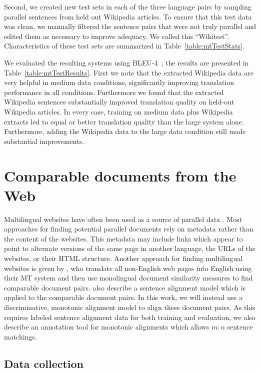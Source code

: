 Second, we created new test sets in each of the three language
pairs by sampling parallel sentences from held out Wikipedia
articles.  To ensure that this test data was clean, we manually
filtered the sentence pairs that were not truly parallel and
edited them as necessary to improve adequacy.  We called
this ``Wikitest''. Characteristics of
these test sets are summarized in Table~\ref{table:mtTestStats}.

We evaluated the resulting systems using
BLEU-4~\citep{Papineni02}; the results are presented in
Table~\ref{table:mtTestResults}.  First we note that the extracted
Wikipedia data are very helpful in medium data conditions,
significantly improving translation performance in all conditions.
Furthermore we found that the extracted Wikipedia sentences
substantially improved translation quality on held-out Wikipedia
articles. In every case, training on medium data plus Wikipedia
extracts led to equal or better translation quality than the large
system alone. Furthermore, adding the Wikipedia data to the large
data condition still made substantial improvements.

\section{Comparable documents from the Web}

Multilingual websites have often been used as a source of parallel data
\citep{Resnik03,Huang05,Shi06}. Most approaches for finding potential parallel
documents rely on metadata rather than the content of the websites. 
This metadata may include links which appear to point to alternate versions of the same
page in another language, the URLs of the websites, or their HTML structure.
Another approach for finding multilingual websites is given by
\citet{Uszkoreit10}, who translate all non-English web pages into English using
their MT system and then use monolingual document similarity measures to find
comparable document pairs. \citet{Uszkoreit10} also describe a sentence
alignment model which is applied to the comparable document pairs. In this work,
we will instead use a discriminative, monotonic alignment model to align these document
pairs. As this requires labeled sentence alignment data for both training and
evaluation, we also describe an annotation tool for monotonic alignments which 
allows $m:n$ sentence matchings.

\subsection{Data collection}

